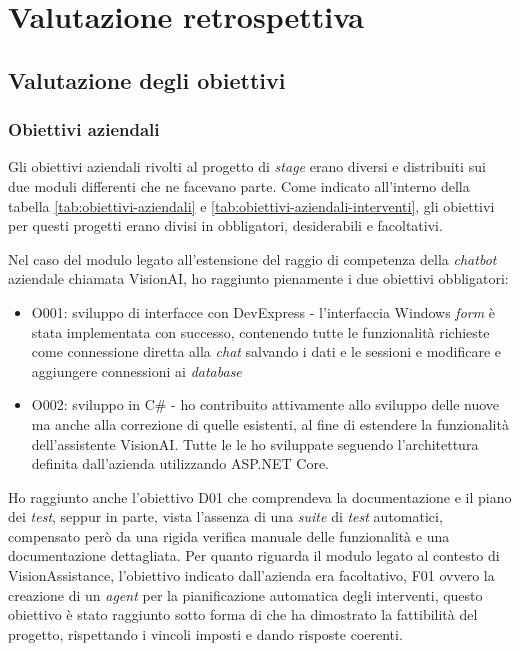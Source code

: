 \chapter{Valutazione retrospettiva}
\label{chap:Valutazione-Retrospettiva}

\section{Valutazione degli obiettivi}
\subsection{Obiettivi  aziendali}
Gli obiettivi aziendali rivolti al progetto di \textit{stage} erano diversi e distribuiti sui due moduli differenti che ne facevano parte. Come indicato all'interno della tabella \ref{tab:obiettivi-aziendali} e \ref{tab:obiettivi-aziendali-interventi}, gli obiettivi per questi progetti erano divisi in obbligatori, desiderabili e facoltativi.

Nel caso del modulo legato all'estensione del raggio di competenza della \textit{chatbot} aziendale chiamata VisionAI, ho raggiunto pienamente i due obiettivi obbligatori:
\begin{itemize}
	\item O001: sviluppo di interfacce con DevExpress - l'interfaccia Windows \textit{form} è stata implementata con successo, contenendo tutte le funzionalità richieste come connessione diretta alla \textit{chat} salvando i dati e le sessioni e modificare e aggiungere connessioni ai \textit{database} 
	\item O002: sviluppo   in C\# - ho contribuito attivamente allo sviluppo delle nuove  ma anche alla correzione di quelle esistenti, al fine di estendere la funzionalità dell'assistente VisionAI. Tutte le  le ho  sviluppate seguendo l'architettura definita dall'azienda utilizzando ASP.NET Core. 
\end{itemize}
Ho raggiunto anche l'obiettivo D01 che comprendeva la documentazione e il piano dei \textit{test}, seppur in parte, vista l'assenza di una \textit{suite} di \textit{test} automatici, compensato però da una rigida verifica manuale delle funzionalità e una documentazione dettagliata.
Per quanto riguarda il modulo legato al contesto di VisionAssistance, l'obiettivo indicato dall'azienda era facoltativo, F01 ovvero la creazione di un \textit{agent} per la pianificazione automatica degli interventi, questo obiettivo è stato raggiunto sotto forma di  che ha dimostrato la fattibilità del progetto, rispettando i vincoli imposti e dando risposte coerenti.

